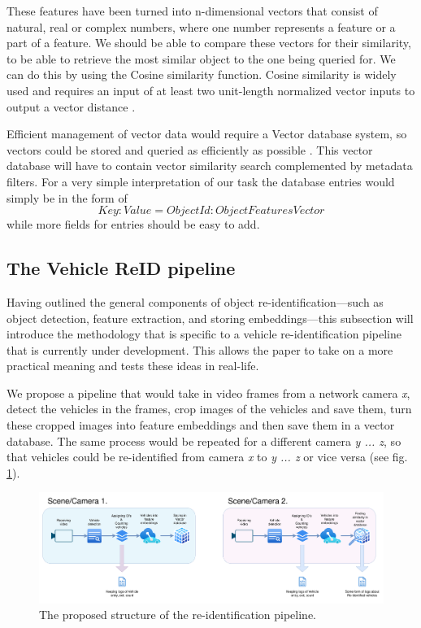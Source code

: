 \documentclass[conference]{IEEEtran} %
\begin{document}
		These features have been turned into n-dimensional vectors that consist of natural, real or complex numbers, where one number represents a feature or a part of a feature. We should be able to compare these vectors for their similarity, to be able to retrieve the most similar object to the one being queried for. We can do this by using the Cosine similarity function. Cosine similarity is widely used and requires an input of at least two unit-length normalized vector inputs to output a vector distance \cite{bayardo2007scaling}.
		
		Efficient management of vector data would require a Vector database system, so vectors could be stored and queried as efficiently as possible \cite{taipalus2024vector}. This vector database will have to contain vector similarity search complemented by metadata filters. For a very simple interpretation of our task the database entries would simply be in the form of $$ Key:Value = ObjectId:ObjectFeaturesVector $$ while more fields for entries should be easy to add.
		
	\subsection{The Vehicle ReID pipeline}
	
		Having outlined the general components of object re-identification—such as object detection, feature extraction, and storing embeddings—this subsection will introduce the methodology that is specific  to a vehicle re-identification pipeline that is currently under development. This allows the paper to take on a more practical meaning and tests these ideas in real-life.
		
		We propose a pipeline that would take in video frames from a network camera \textit{x}, detect the vehicles in the frames, crop images of the vehicles and save them, turn these cropped images into feature embeddings and then save them in a vector database. The same process would be repeated for a different camera \textit{y ... z}, so that vehicles could be re-identified from camera \textit{x} to \textit{y ... z} or vice versa (see fig. \ref{fig:fig3}).
		\begin{figure}[h]
			\centering
			\includegraphics[width=\textwidth]{re_id_diagramma_3.png} %
			\caption{The proposed structure of the re-identification pipeline.}
			\label{fig:fig3} %
		\end{figure}
		
\end{document}
